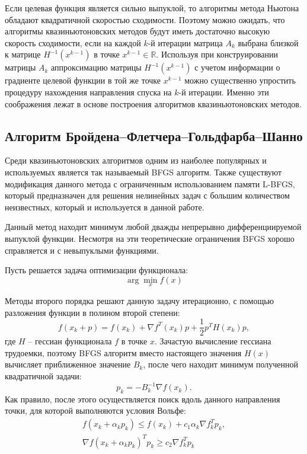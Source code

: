 Если целевая функция является сильно выпуклой, то алгоритмы метода Ньютона 
обладают квадратичной скоростью сходимости. Поэтому можно ожидать, что 
алгоритмы квазиньютоновских методов будут иметь достаточно высокую скорость 
сходимости, если на каждой \( k \)-й итерации матрица \( A_k \) выбрана 
близкой к матрице \( H^{-1}(x^{k-1}) \) в точке \( x^{k-1} \in \mathbb{R} \). 
Используя при конструировании матрицы \( A_k \) аппроксимацию матрицы 
\( H^{-1}(x^{k-1}) \) с учетом информации о градиенте целевой функции в той же 
точке \( x^{k-1} \) можно существенно упростить процедуру нахождения 
направления спуска на \( k \)-й итерации. Именно эти соображения лежат в 
основе построения алгоритмов квазиньютоновских методов.\cite{bib:methods}

\subsection{Алгоритм Бройдена--Флетчера--Гольдфарба--Шанно}

Среди квазиньютоновских алгоритмов одним из наиболее популярных и используемых 
является так называемый BFGS алгоритм. Также существуют модификация данного 
метода с ограниченным использованием памяти L-BFGS, который предназначен для 
решения нелинейных задач с большим количеством неизвестных, который и 
используется в данной работе.

Данный метод находит минимум любой дважды непрерывно дифференциируемой 
выпуклой функции. Несмотря на эти теоретические ограничения BFGS хорошо 
справляется и с невыпуклыми функциями.

Пусть решается задача оптимизации функционала:
\[ 
    \arg\min_x f(x) 
\]

Методы второго порядка решают данную задачу итерационно, с помощью разложения 
функции в полином второй степени:
\[ 
    f(x_k + p) = f(x_k) + \nabla f^T(x_k) p + \frac{1}{2} p^T H(x_k) p, 
\]
где \( H \) -- гессиан функционала \( f \) в точке \( x \). Зачастую 
вычисление гессиана трудоемки, поэтому BFGS алгоритм вместо настоящего 
значения \( H(x) \) вычисляет приближенное значение \( B_k \), после чего 
находит минимум полученной квадратичной задачи:
\[ 
    p_k = - B_k^{-1}\nabla f(x_k). 
\]
Как правило, после этого осуществляется поиск вдоль данного направления точки, 
для которой выполняются условия Вольфе:
\begin{gather}
    f(x_k + \alpha_k p_k) \leq f(x_k) + c_1 \alpha_k \nabla f_k^T p_k, 
    \nonumber \\
    \nabla f(x_k + \alpha_k p_k)^T p_k \geq c_2 \nabla f_k^T p_k
    \label{eq:wolfe}
\end{gather}

